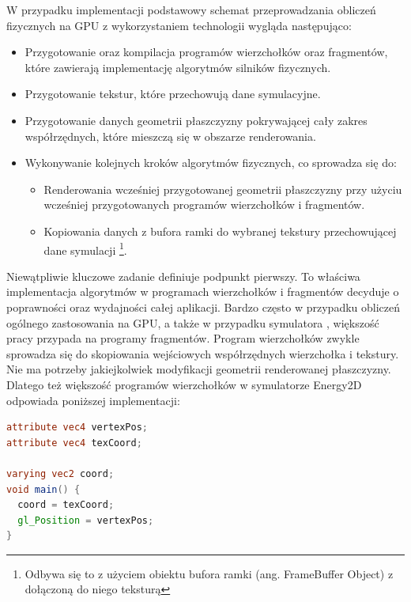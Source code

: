 W przypadku implementacji  podstawowy schemat przeprowadzania
obliczeń fizycznych na GPU z wykorzystaniem technologii  wygląda
następująco:

\begin{itemize}

\item Przygotowanie oraz kompilacja programów wierzchołków oraz fragmentów,
które zawierają implementację algorytmów silników fizycznych.

\item Przygotowanie tekstur, które przechowują dane symulacyjne. 

\item Przygotowanie danych geometrii płaszczyzny pokrywającej cały zakres
współrzędnych, które mieszczą się w obszarze renderowania.

\item Wykonywanie kolejnych kroków algorytmów fizycznych, co sprowadza się do:
	
	\begin{itemize}
	\item Renderowania wcześniej przygotowanej geometrii płaszczyzny przy użyciu
	wcześniej przygotowanych programów wierzchołków i fragmentów.

    \item Kopiowania danych z bufora ramki do wybranej tekstury przechowującej
	dane symulacji \footnote{Odbywa się to z użyciem obiektu bufora ramki (ang.
	FrameBuffer Object) z dołączoną do niego teksturą}.
	\end{itemize}

\end{itemize}

Niewątpliwie kluczowe zadanie definiuje podpunkt pierwszy. To właściwa
implementacja algorytmów w programach wierzchołków i fragmentów decyduje o
poprawności oraz wydajności całej aplikacji. Bardzo często w przypadku obliczeń
ogólnego zastosowania na GPU, a także w przypadku symulatora ,
większość pracy przypada na programy fragmentów. Program wierzchołków zwykle
sprowadza się do skopiowania wejściowych współrzędnych wierzchołka i tekstury.
Nie ma potrzeby jakiejkolwiek modyfikacji geometrii renderowanej płaszczyzny.
Dlatego też większość programów wierzchołków w symulatorze Energy2D odpowiada
poniższej implementacji:

\begin{lstlisting}[language=GLSL, caption=Typowa implementacja programu
wierzchołków w symulatorze \ow{Energy2D} (język GLSL)]
attribute vec4 vertexPos;
attribute vec4 texCoord;

varying vec2 coord;
void main() {
  coord = texCoord;
  gl_Position = vertexPos;
}
\end{lstlisting}

